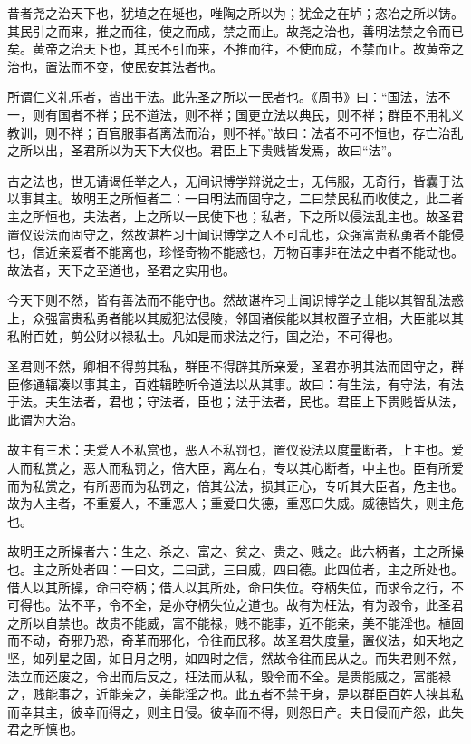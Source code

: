 \documentclass[]{article}
\begin{document}
昔者尧之治天下也，犹埴之在埏也，唯陶之所以为；犹金之在垆；恣冶之所以铸。其民引之而来，推之而往，使之而成，禁之而止。故尧之治也，善明法禁之令而已矣。黄帝之治天下也，其民不引而来，不推而往，不使而成，不禁而止。故黄帝之治也，置法而不变，使民安其法者也。

所谓仁义礼乐者，皆出于法。此先圣之所以一民者也。《周书》曰：``国法，法不一，则有国者不祥；民不道法，则不祥；国更立法以典民，则不祥；群臣不用礼义教训，则不祥；百官服事者离法而治，则不祥。''故曰：法者不可不恒也，存亡治乱之所以出，圣君所以为天下大仪也。君臣上下贵贱皆发焉，故曰``法''。

古之法也，世无请谒任举之人，无间识博学辩说之士，无伟服，无奇行，皆囊于法以事其主。故明王之所恒者二：一曰明法而固守之，二曰禁民私而收使之，此二者主之所恒也，夫法者，上之所以一民使下也；私者，下之所以侵法乱主也。故圣君置仪设法而固守之，然故谌杵习士闻识博学之人不可乱也，众强富贵私勇者不能侵也，信近亲爱者不能离也，珍怪奇物不能惑也，万物百事非在法之中者不能动也。故法者，天下之至道也，圣君之实用也。

今天下则不然，皆有善法而不能守也。然故谌杵习士闻识博学之士能以其智乱法惑上，众强富贵私勇者能以其威犯法侵陵，邻国诸侯能以其权置子立相，大臣能以其私附百姓，剪公财以禄私士。凡如是而求法之行，国之治，不可得也。

圣君则不然，卿相不得剪其私，群臣不得辟其所亲爱，圣君亦明其法而固守之，群臣修通辐凑以事其主，百姓辑睦听令道法以从其事。故曰：有生法，有守法，有法于法。夫生法者，君也；守法者，臣也；法于法者，民也。君臣上下贵贱皆从法，此谓为大治。

故主有三术：夫爱人不私赏也，恶人不私罚也，置仪设法以度量断者，上主也。爱人而私赏之，恶人而私罚之，倍大臣，离左右，专以其心断者，中主也。臣有所爱而为私赏之，有所恶而为私罚之，倍其公法，损其正心，专听其大臣者，危主也。故为人主者，不重爱人，不重恶人；重爱曰失德，重恶曰失威。威德皆失，则主危也。

故明王之所操者六：生之、杀之、富之、贫之、贵之、贱之。此六柄者，主之所操也。主之所处者四：一曰文，二曰武，三曰威，四曰德。此四位者，主之所处也。借人以其所操，命曰夺柄；借人以其所处，命曰失位。夺柄失位，而求令之行，不可得也。法不平，令不全，是亦夺柄失位之道也。故有为枉法，有为毁令，此圣君之所以自禁也。故贵不能威，富不能禄，贱不能事，近不能亲，美不能淫也。植固而不动，奇邪乃恐，奇革而邪化，令往而民移。故圣君失度量，置仪法，如天地之坚，如列星之固，如日月之明，如四时之信，然故令往而民从之。而失君则不然，法立而还废之，令出而后反之，枉法而从私，毁令而不全。是贵能威之，富能禄之，贱能事之，近能亲之，美能淫之也。此五者不禁于身，是以群臣百姓人挟其私而幸其主，彼幸而得之，则主日侵。彼幸而不得，则怨日产。夫日侵而产怨，此失君之所慎也。
\end{document}
